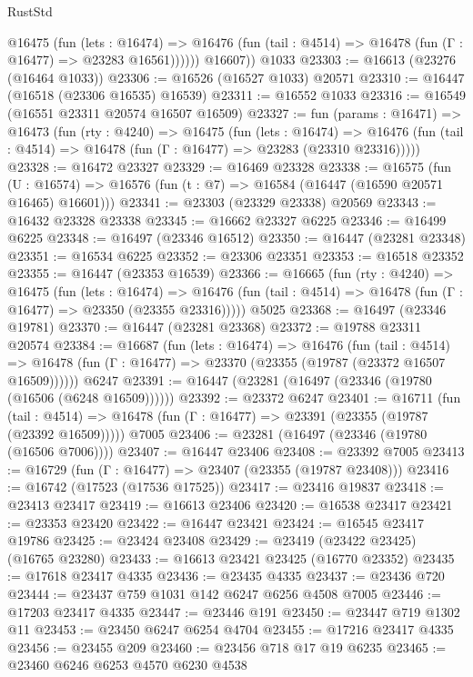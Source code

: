 \begin{lexlean}{RustStd}
\begin{coremodule}
            @16475
              (fun (lets : @16474) =>
              @16476 (fun (tail : @4514) => @16478 (fun (Γ : @16477) => @23283 @16561))))))
        @16607))
    @1033
@23303 := @16613 (@23276 (@16464 @1033))
@23306 := @16526 (@16527 @1033) @20571
@23310 := @16447 (@16518 (@23306 @16535) @16539)
@23311 := @16552 @1033
@23316 := @16549 (@16551 @23311 @20574 @16507 @16509)
@23327 := fun (params : @16471) =>
  @16473
    (fun (rty : @4240) =>
    @16475
      (fun (lets : @16474) =>
      @16476 (fun (tail : @4514) => @16478 (fun (Γ : @16477) => @23283 (@23310 @23316)))))
@23328 := @16472 @23327
@23329 := @16469 @23328
@23338 := @16575
    (fun (U : @16574) => @16576 (fun (t : @7) => @16584 (@16447 (@16590 @20571 @16465) @16601)))
@23341 := @23303 (@23329 @23338) @20569
@23343 := @16432 @23328 @23338
@23345 := @16662 @23327 @6225
@23346 := @16499 @6225
@23348 := @16497 (@23346 @16512)
@23350 := @16447 (@23281 @23348)
@23351 := @16534 @6225
@23352 := @23306 @23351
@23353 := @16518 @23352
@23355 := @16447 (@23353 @16539)
@23366 := @16665
    (fun (rty : @4240) =>
    @16475
      (fun (lets : @16474) =>
      @16476 (fun (tail : @4514) => @16478 (fun (Γ : @16477) => @23350 (@23355 @23316)))))
    @5025
@23368 := @16497 (@23346 @19781)
@23370 := @16447 (@23281 @23368)
@23372 := @19788 @23311 @20574
@23384 := @16687
    (fun (lets : @16474) =>
    @16476
      (fun (tail : @4514) =>
      @16478 (fun (Γ : @16477) => @23370 (@23355 (@19787 (@23372 @16507 @16509))))))
    @6247
@23391 := @16447 (@23281 (@16497 (@23346 (@19780 (@16506 (@6248 @16509))))))
@23392 := @23372 @6247
@23401 := @16711
    (fun (tail : @4514) => @16478 (fun (Γ : @16477) => @23391 (@23355 (@19787 (@23392 @16509)))))
    @7005
@23406 := @23281 (@16497 (@23346 (@19780 (@16506 @7006))))
@23407 := @16447 @23406
@23408 := @23392 @7005
@23413 := @16729 (fun (Γ : @16477) => @23407 (@23355 (@19787 @23408)))
@23416 := @16742 (@17523 (@17536 @17525))
@23417 := @23416 @19837
@23418 := @23413 @23417
@23419 := @16613 @23406
@23420 := @16538 @23417
@23421 := @23353 @23420
@23422 := @16447 @23421
@23424 := @16545 @23417 @19786
@23425 := @23424 @23408
@23429 := @23419 (@23422 @23425) (@16765 @23280)
@23433 := @16613 @23421 @23425 (@16770 @23352)
@23435 := @17618 @23417 @4335
@23436 := @23435 @4335
@23437 := @23436 @720
@23444 := @23437 @759 @1031 @142 @6247 @6256 @4508 @7005
@23446 := @17203 @23417 @4335
@23447 := @23446 @191
@23450 := @23447 @719 @1302 @11
@23453 := @23450 @6247 @6254 @4704
@23455 := @17216 @23417 @4335
@23456 := @23455 @209
@23460 := @23456 @718 @17 @19 @6235
@23465 := @23460 @6246 @6253 @4570 @6230 @4538

\end{coremodule}
\end{lexlean}
